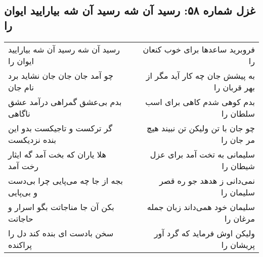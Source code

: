 \begin{center}
\section*{غزل شماره ۵۸: رسید آن شه رسید آن شه بیارایید ایوان را}
\label{sec:0058}
\begin{longtable}{l p{0.5cm} r}
رسید آن شه رسید آن شه بیارایید ایوان را
&&
فروبرید ساعدها برای خوب کنعان را
\\
چو آمد جان جان جان نشاید برد نام جان
&&
به پیشش جان چه کار آید مگر از بهر قربان را
\\
بدم بی‌عشق گمراهی درآمد عشق ناگاهی
&&
بدم کوهی شدم کاهی برای اسب سلطان را
\\
گر ترکست و تاجیکست بدو این بنده نزدیکست
&&
چو جان با تن ولیکن تن نبیند هیچ مر جان را
\\
هلا یاران که بخت آمد گه ایثار رخت آمد
&&
سلیمانی به تخت آمد برای عزل شیطان را
\\
بجه از جا چه می‌پایی چرا بی‌دست و بی‌پایی
&&
نمی‌دانی ز هدهد جو ره قصر سلیمان را
\\
بکن آن جا مناجاتت بگو اسرار و حاجاتت
&&
سلیمان خود همی‌داند زبان جمله مرغان را
\\
سخن بادست ای بنده کند دل را پراکنده
&&
ولیکن اوش فرماید که گرد آور پریشان را
\\
\end{longtable}
\end{center}
